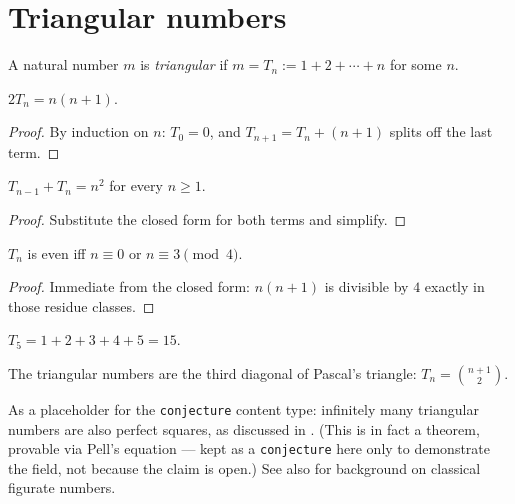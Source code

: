 \documentclass{article}
\begin{document}
\section{Triangular numbers}

\begin{definition}\label{def:triangular}\leanok
A natural number $m$ is \emph{triangular} if $m = T_n := 1 + 2 + \cdots + n$
for some $n$.
\end{definition}

\begin{theorem}\label{thm:triangular-closed-form}\leanok
$2T_n = n(n+1)$.
\end{theorem}
\begin{proof}
By induction on $n$: $T_0 = 0$, and $T_{n+1} = T_n + (n+1)$ splits off the
last term.
\end{proof}

\begin{proposition}\label{prop:triangular-consecutive-sum}
$T_{n-1} + T_n = n^2$ for every $n \geq 1$.
\end{proposition}
\begin{proof}
Substitute the closed form for both terms and simplify.
\end{proof}

\begin{corollary}\label{cor:triangular-even-odd}
$T_n$ is even iff $n \equiv 0$ or $n \equiv 3 \pmod 4$.
\end{corollary}
\begin{proof}
Immediate from the closed form: $n(n+1)$ is divisible by $4$ exactly in
those residue classes.
\end{proof}

\begin{example}[$T_5$]\label{ex:triangular-five}
$T_5 = 1+2+3+4+5 = 15$.
\end{example}

\begin{remark}\label{rem:pascal}
The triangular numbers are the third diagonal of Pascal's triangle:
$T_n = \binom{n+1}{2}$.
\end{remark}

\begin{conjecture}\label{conj:square-triangular}
As a placeholder for the \texttt{conjecture} content type: infinitely many
triangular numbers are also perfect squares, as discussed in \cite{pell1996equation}.
(This is in fact a theorem, provable via Pell's equation — kept as a
\texttt{conjecture} here only to demonstrate the field, not because the claim
is open.) See also \cite{conway1996book} for background on classical figurate
numbers.
\end{conjecture}
\end{document}
